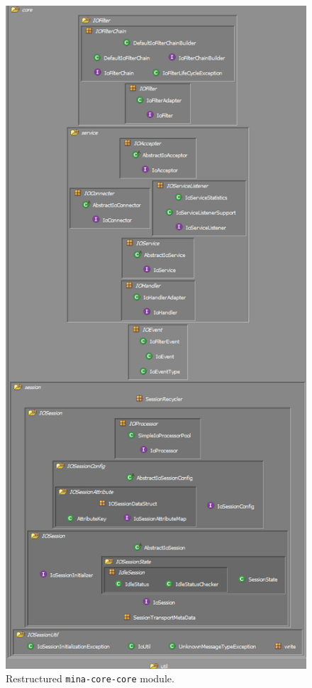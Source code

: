 \begin{figure}[H]
    \centering
    \includegraphics[scale=0.7]{images/MINA_core_core_restructured.png}
    \caption{Restructured \texttt{mina-core-core} module.}
    \label{fig:mina_core_core_restructured}
\end{figure}


